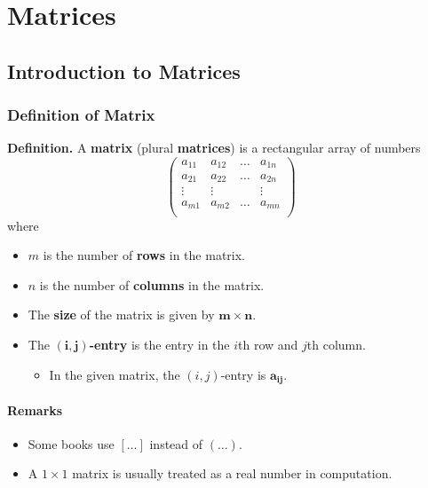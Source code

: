 \documentclass[../ma2001_notes.tex]{subfiles}
\begin{document}
\chapter{Matrices}

\section{Introduction to Matrices}
\subsection{Definition of Matrix}
\textbf{Definition.} A \textbf{matrix} (plural \textbf{matrices}) is a rectangular array of numbers
\[\left(\begin{array}{cccc}
a_{11} & a_{12} & \ldots & a_{1n} \\ 
a_{21} & a_{22} & \ldots & a_{2n} \\ 
\vdots & \vdots & & \vdots \\ 
a_{m1} & a_{m2} & \ldots & a_{mn} \\
\end{array}\right)\]
where
\begin{itemize}
	\item \(m\) is the number of \textbf{rows} in the matrix.
	\item \(n\) is the number of \textbf{columns} in the matrix.
	\item The \textbf{size} of the matrix is given by \(\bm{m\times n}\).
	\item The \(\bm{(i,j)}\)\textbf{-entry} is the entry in the \(i\)th row and \(j\)th column.
	\begin{itemize}
		\item In the given matrix, the \((i,j)\)-entry is \(\bm{a_{ij}}\).
	\end{itemize}
\end{itemize}
\subsubsection{Remarks}
\begin{itemize}
	\item Some books use \([\ldots]\) instead of \((\ldots)\).
	\item A \(1\times1\) matrix is usually treated as a real number in computation.
\end{itemize}
\end{document}
